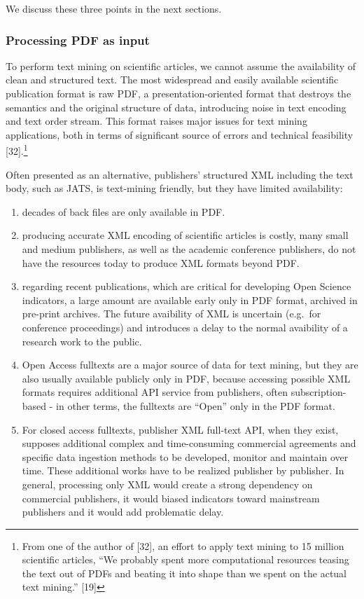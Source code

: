\documentclass[
]{article}
\begin{document}
We discuss these three points in the next sections.

\hypertarget{processing-pdf-as-input}{%
\subsubsection{Processing PDF as input}\label{processing-pdf-as-input}}

To perform text mining on scientific articles, we cannot assume the
availability of clean and structured text. The most widespread and
easily available scientific publication format is raw PDF, a
presentation-oriented format that destroys the semantics and the
original structure of data, introducing noise in text encoding and text
order stream. This format raises major issues for text mining
applications, both in terms of significant source of errors and
technical feasibility {[}32{]}.\footnote{From one of the author of
  {[}32{]}, an effort to apply text mining to 15 million scientific
  articles, ``We probably spent more computational resources teasing the
  text out of PDFs and beating it into shape than we spent on the actual
  text mining.'' {[}19{]}}

Often presented as an alternative, publishers' structured XML including
the text body, such as JATS, is text-mining friendly, but they have
limited availability:

\begin{enumerate}
\def\labelenumi{(\roman{enumi})}
\item
  decades of back files are only available in PDF.
\item
  producing accurate XML encoding of scientific articles is costly, many
  small and medium publishers, as well as the academic conference
  publishers, do not have the resources today to produce XML formats
  beyond PDF.
\item
  regarding recent publications, which are critical for developing Open
  Science indicators, a large amount are available early only in PDF
  format, archived in pre-print archives. The future avaibility of XML
  is uncertain (e.g.~for conference proceedings) and introduces a delay
  to the normal avaibility of a research work to the public.
\item
  Open Access fulltexts are a major source of data for text mining, but
  they are also usually available publicly only in PDF, because
  accessing possible XML formats requires additional API service from
  publishers, often subscription-based - in other terms, the fulltexts
  are ``Open'' only in the PDF format.
\item
  For closed access fulltexts, publisher XML full-text API, when they
  exist, supposes additional complex and time-consuming commercial
  agreements and specific data ingestion methods to be developed,
  monitor and maintain over time. These additional works have to be
  realized publisher by publisher. In general, processing only XML would
  create a strong dependency on commercial publishers, it would biased
  indicators toward mainstream publishers and it would add problematic
  delay.
\end{enumerate}
\end{document}
